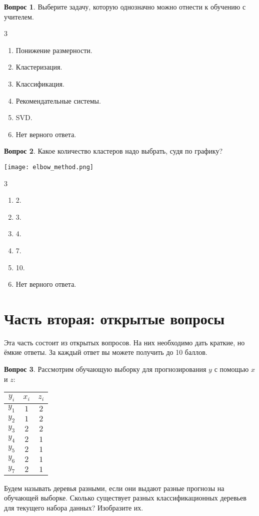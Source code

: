 \documentclass[12pt]{article}
\newenvironment{answerlist}[1][3]{
\begin{multicols}{#1}

\begin{enumerate}[label=\fbox{\emph{\Alph*}},ref=\emph{\alph*}]
}
{
\item Нет верного ответа.
\end{enumerate}
\end{multicols}
}
\theoremstyle{definition}
\newtheorem{question}{Вопрос}
\begin{document}
\begin{question}
Выберите задачу, которую однозначно можно отнести к обучению с учителем.
\begin{answerlist}
  \item Понижение размерности.
  \item Кластеризация.
  \item Классификация.
  \item Рекомендательные системы.
  \item SVD.
\end{answerlist}
\end{question}

\begin{question}
Какое количество кластеров надо выбрать, судя по графику?
    \begin{center}
        \texttt{[image: elbow\_method.png]}
    \end{center}
\begin{answerlist}
  \item 2.
  \item 3.
  \item 4.
  \item 7.
  \item 10.
\end{answerlist}
\end{question}



\newpage 

\section*{Часть вторая: открытые вопросы}

Эта часть состоит из открытых вопросов. На них необходимо дать краткие, но ёмкие ответы. За каждый ответ вы можете получить до 10 баллов.

\begin{question}
Рассмотрим обучающую выборку для прогнозирования $y$ с помощью $x$ и $z$:
\begin{center}
    \begin{tabular}{ccc}
        \toprule
        $y_i$ & $x_i$ & $z_i$ \\
        \midrule
        $y_1$ & $1$ & $2$ \\
        $y_2$ & $1$ & $2$ \\
        $y_3$ & $2$ & $2$ \\
        $y_4$ & $2$ & $1$\\
        $y_5$ & $2$ & $1$ \\
        $y_6$ & $2$ & $1$ \\
        $y_7$ & $2$ & $1$ \\
        \bottomrule
    \end{tabular}
\end{center}

Будем называть деревья разными, если они выдают разные прогнозы на обучающей выборке. Сколько существует разных классификационных деревьев  для текущего набора данных? Изобразите их. 
\end{question}
\end{document}
